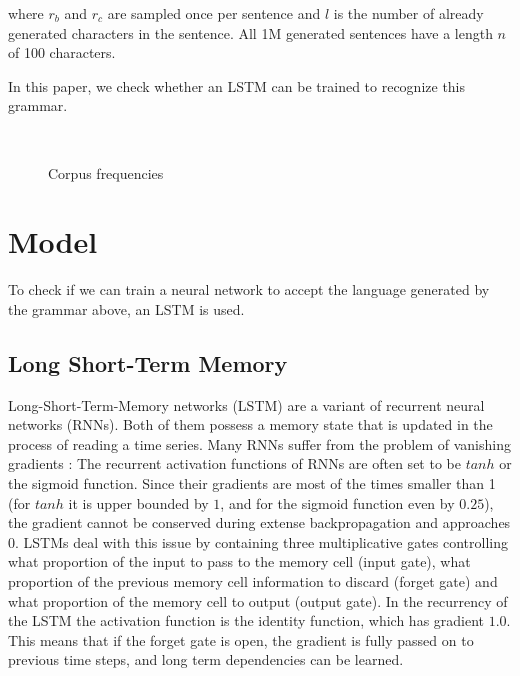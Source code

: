 \documentclass[11pt,a4paper]{article}
\newlength\figureheight
\newlength\figurewidth
\begin{document}
where $r_b$ and $r_c$ are sampled once per sentence and $l$ is the number of already generated characters in the sentence.
All 1M generated sentences have a length $n$ of 100 characters.

In this paper, we check whether an LSTM can be trained to recognize this grammar.

\setlength\figureheight{4cm}
\setlength\figurewidth{\linewidth}
\begin{figure}[ht]
    \\%
    \caption{Corpus frequencies}%
    \label{fig:corpus_frequencies}%
\end{figure}

\section{Model}

To check if we can train a neural network to accept the language generated by the grammar above, an LSTM is used.

\subsection{Long Short-Term Memory}

Long-Short-Term-Memory networks (LSTM) \cite{hochreiter1997long} are a variant of recurrent neural networks (RNNs). Both of them possess a memory state that is updated in the process of reading a time series. Many RNNs suffer from the problem of vanishing gradients \cite{hochreiter1997long}: The recurrent activation functions of RNNs are often set to be $tanh$ or the sigmoid function. Since their gradients are most of the times smaller than 1 (for $tanh$ it is upper bounded by $1$, and for the sigmoid function even by $0.25$), the gradient cannot be conserved during extense backpropagation and approaches 0. LSTMs deal with this issue by containing three multiplicative gates controlling what proportion of the input to pass to the memory cell (input gate), what proportion of the previous memory cell information to discard (forget gate) and what proportion of the memory cell to output (output gate). In the recurrency of the LSTM the activation function is the identity function, which has gradient $1.0$. This means that if the forget gate is open, the gradient is fully passed on to previous time steps, and long term dependencies can be learned.
\end{document}
